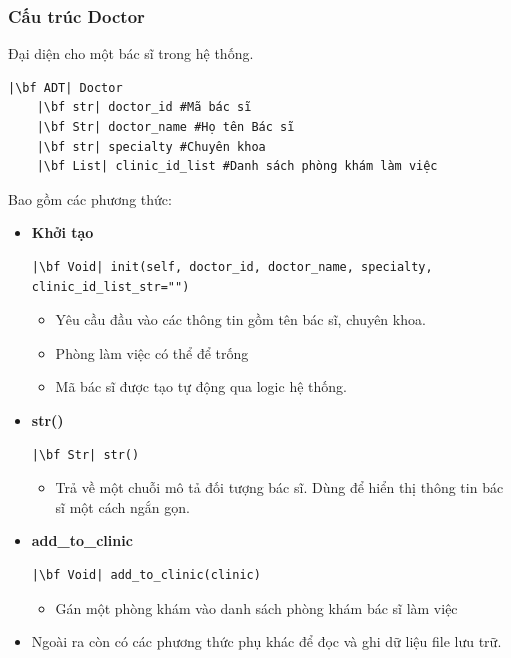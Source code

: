 \subsubsection{Cấu trúc Doctor}
 Đại diện cho một bác sĩ trong hệ thống.
\begin{verbatim}
|\bf ADT| Doctor
    |\bf str| doctor_id #Mã bác sĩ
    |\bf Str| doctor_name #Họ tên Bác sĩ
    |\bf str| specialty #Chuyên khoa
    |\bf List| clinic_id_list #Danh sách phòng khám làm việc
\end{verbatim}
Bao gồm các phương thức:
\begin{itemize}
    \item \textbf{Khởi tạo}
\begin{verbatim}
|\bf Void| init(self, doctor_id, doctor_name, specialty, clinic_id_list_str="")
\end{verbatim}
\begin{itemize}
    \item Yêu cầu đầu vào các thông tin gồm tên bác sĩ, chuyên khoa.
    \item Phòng làm việc có thể để trống
    \item Mã bác sĩ được tạo tự động qua logic hệ thống.
\end{itemize}
    \item \textbf{str()}
\begin{verbatim}
|\bf Str| str()
\end{verbatim}
\begin{itemize}
    \item Trả về một chuỗi mô tả đối tượng bác sĩ. Dùng để hiển thị thông tin bác sĩ một cách ngắn gọn.
\end{itemize}
\item \textbf{add\_to\_clinic}
\begin{verbatim}
|\bf Void| add_to_clinic(clinic)
\end{verbatim}
\begin{itemize}
    \item Gán một phòng khám vào danh sách phòng khám bác sĩ làm việc
\end{itemize}
\item Ngoài ra còn có các phương thức phụ khác để đọc và ghi dữ liệu file lưu trữ.
\end{itemize}
